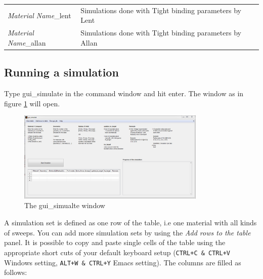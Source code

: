 		\begin{tabular}{ll}
			{\it Material Name}\_lent		&	Simulations done with Tight binding parameters by Lent	\\
			{\it Material Name}\_allan	&	Simulations done with Tight binding parameters by Allan	\\
		\end{tabular}
		
	
		\subsection{Running a simulation} \label{sec:RunSim}
			Type gui\_simulate  in the \matlab command window and hit enter. The window as in figure \ref{fig:gui_simulate} will open.
			\begin{figure}[htbp]
				\centering
				\includegraphics[width=0.8\textwidth]{Fig/Scrn_gui_simulate.png}
				\caption{The gui\_simualte window}
				\label{fig:gui_simulate}
			\end{figure}
			A simulation set is defined as one row of the table, i.e one material with all kinds of sweeps. You can add more simulation sets
			by using the {\it Add rows to the table} panel.
			It is possible to copy and paste single cells of the table using the appropriate short cuts of your \matlab default keyboard setup
			(\lstinline{CTRL+C & CTRL+V} Windows setting, \lstinline{ALT+W & CTRL+Y} Emacs setting).
			The columns are filled as follows:
